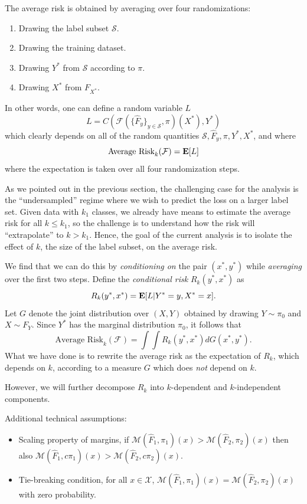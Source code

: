 \documentclass[12pt]{article}
\begin{document}
The average risk is obtained by averaging over four randomizations:
\begin{enumerate}
\item Drawing the label subset $\mathcal{S}$.
\item Drawing the training dataset.
\item Drawing $Y^*$ from $\mathcal{S}$ according to $\pi$.
\item Drawing $X^*$ from $F_{X^*}$.
\end{enumerate}

In other words, one can define a random variable $L$
\[
L = C(\mathcal{F}(\{\hat{F}_y\}_{y \in \mathcal{S}}, \pi)(X^*), Y^*)
\]
which clearly depends on all of the random quantities $\mathcal{S}, \hat{F}_y, \pi, Y^*, X^*$, and where
\[
\text{Average Risk}_k(\mathcal{F}) = \textbf{E}[L]
\]
where the expectation is taken over all four randomization steps.

As we pointed out in the previous section, the challenging case for
the analysis is the ``undersampled'' regime where we wish to predict
the loss on a larger label set.  Given data with $k_1$ classes, we
already have means to estimate the average risk for all $k \leq k_1$,
so the challenge is to understand how the risk will ``extrapolate'' to
$k > k_1$.  Hence, the goal of the current analysis is to isolate the
effect of $k$, the size of the label subset, on the average risk.

We find that we can do this by \emph{conditioning on} the pair $(x^*,
y^*)$ while \emph{averaging} over the first two steps.
Define the \emph{conditional risk} $R_k(y^*, x^*)$ as
\[
R_k(y^*, x^*) = \textbf{E}[L|Y^*=y, X^* = x].
\]
Let $G$ denote the joint distribution over $(X, Y)$ obtained by
drawing $Y \sim \pi_0$ and $X \sim F_Y$.  Since $Y^*$ has the marginal
distribution $\pi_0$, it follows that
\begin{equation}\label{eq:rk_eq}
\text{Average Risk}_k(\mathcal{F}) = \int \int R_k(y^*, x^*) dG(x^*, y^*).
\end{equation}
What we have done is to rewrite the average risk as the expectation of
$R_k$, which depends on $k$, according to a measure $G$ which does
\emph{not} depend on $k$.

However, we will further decompose $R_k$ into $k$-dependent and $k$-independent components.

Additional technical assumptions:
\begin{itemize}
\item 
Scaling property of margins, if $\mathcal{M}(\hat{F}_1, \pi_1)(x) >
\mathcal{M}(\hat{F}_2, \pi_2)(x)$ then also $\mathcal{M}(\hat{F}_1,
c\pi_1)(x) > \mathcal{M}(\hat{F}_2, c\pi_2)(x)$.
\item 
Tie-breaking condition, for all $x \in \mathcal{X}$,
$\mathcal{M}(\hat{F}_1, \pi_1)(x) = \mathcal{M}(\hat{F}_2, \pi_2)(x)$
with zero probability.
\end{itemize}
\end{document}
